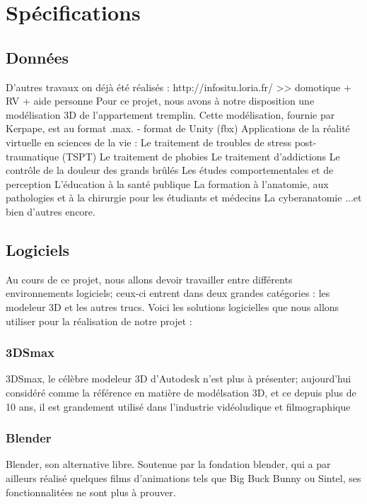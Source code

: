 ﻿\section{Sp\'ecifications}

\subsection{Donn\'ees}
	D’autres travaux on déjà été réalisés : http://infositu.loria.fr/ >> domotique + RV + aide personne
	Pour ce projet, nous avons à notre disposition une modélisation 3D de l’appartement tremplin. Cette modélisation, fournie par Kerpape, est au format .max.
	- format de Unity (fbx)
	Applications de la réalité virtuelle en sciences de la vie :
	Le traitement de troubles de stress post-traumatique (TSPT)
	Le traitement de phobies
	Le traitement d'addictions
	Le contrôle de la douleur des grands brûlés
	Les études comportementales et de perception
	L'éducation à la santé publique
	La formation à l'anatomie, aux pathologies et à la chirurgie pour les étudiants et médecins
	La cyberanatomie
	...et bien d'autres encore.

\subsection{Logiciels}
	Au cours de ce projet, nous allons devoir travailler entre différents environnements logiciels; ceux-ci entrent dans deux grandes catégories : les modeleur 3D et les autres trucs.
	Voici les solutions logicielles que nous allons utiliser pour la réalisation de notre projet :
	
	\subsubsection{3DSmax}
		3DSmax, le célèbre modeleur 3D d’Autodesk n’est plus à présenter; aujourd’hui considéré comme la référence en matière de modélsation 3D, et ce depuis plus de 10 ans, il est grandement utilisé dans l’industrie vidéoludique et filmographique
	
	\subsubsection{Blender} 
		Blender, son alternative libre. Soutenue par la fondation blender, qui a par ailleurs réalisé quelques films d’animations tels que Big Buck Bunny ou Sintel, ses fonctionnalitées ne sont plus à prouver.
	

